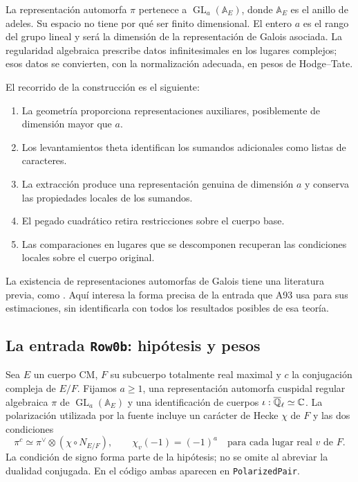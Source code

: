 La representación automorfa $\pi$ pertenece a
$\operatorname{GL}_a(\mathbb A_E)$, donde $\mathbb A_E$ es el anillo
de adeles. Su espacio no tiene por qué ser finito dimensional.
El entero $a$ es el rango del grupo lineal y será la dimensión de
la representación de Galois asociada. La regularidad algebraica
prescribe datos infinitesimales en los lugares complejos; esos datos
se convierten, con la normalización adecuada, en pesos de Hodge--Tate.

El recorrido de la construcción es el siguiente:
\begin{enumerate}
 \item La geometría proporciona representaciones auxiliares,
       posiblemente de dimensión mayor que $a$.
 \item Los levantamientos theta identifican los sumandos adicionales
       como listas de caracteres.
 \item La extracción produce una representación genuina de dimensión $a$
       y conserva las propiedades locales de los sumandos.
 \item El pegado cuadrático retira restricciones sobre el cuerpo base.
 \item Las comparaciones en lugares que se descomponen recuperan
       las condiciones locales sobre el cuerpo original.
\end{enumerate}
La existencia de representaciones automorfas de Galois tiene una
literatura previa, como \cite{chenevier-harris}. Aquí interesa
la forma precisa de la entrada que A93 usa para sus estimaciones,
sin identificarla con todos los resultados posibles de esa teoría.

\subsection{La entrada \texttt{Row0b}: hipótesis y pesos}
\label{subsec:gal-row}

Sea $E$ un cuerpo CM, $F$ su subcuerpo totalmente real maximal
y $c$ la conjugación compleja de $E/F$. Fijamos $a\ge1$,
una representación automorfa cuspidal regular algebraica $\pi$
de $\operatorname{GL}_a(\mathbb A_E)$ y una identificación de cuerpos
$\iota:\overline{\mathbb{Q}}_\ell\simeq\mathbb{C}$. La polarización utilizada por la
fuente incluye un carácter de Hecke $\chi$ de $F$ y las dos condiciones
\begin{equation}
 \pi^c\simeq\pi^\vee\otimes(\chi\circ N_{E/F}),
 \qquad \chi_v(-1)=(-1)^a
       \quad\text{para cada lugar real }v\text{ de }F.
 \label{eq:gal-polarizacion}
\end{equation}
La condición de signo forma parte de la hipótesis;
no se omite al abreviar la dualidad conjugada.
En el código ambas aparecen en \texttt{PolarizedPair}.

